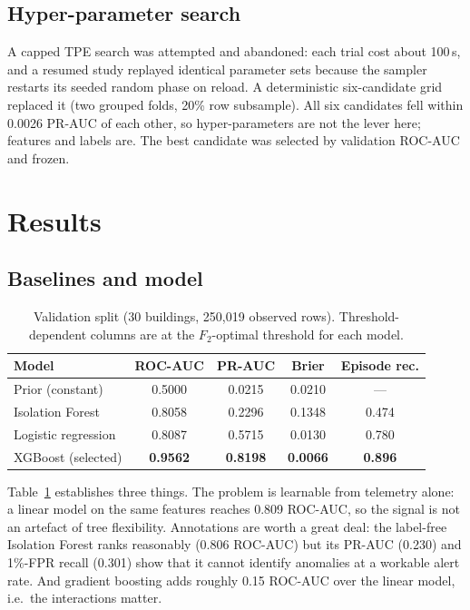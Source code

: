 \documentclass[conference]{IEEEtran}
\begin{document}
\subsection{Hyper-parameter search}

A capped TPE search was attempted and abandoned: each trial cost about 100\,s, and a resumed study
replayed identical parameter sets because the sampler restarts its seeded random phase on reload. A
deterministic six-candidate grid replaced it (two grouped folds, 20\% row subsample). All six
candidates fell within 0.0026 PR-AUC of each other, so hyper-parameters are not the lever here;
features and labels are. The best candidate was selected by validation ROC-AUC and frozen.

\section{Results}
\label{sec:results}

\subsection{Baselines and model}

\begin{table}[t]
\centering
\caption{Validation split (30 buildings, 250{,}019 observed rows). Threshold-dependent columns are at
the $F_2$-optimal threshold for each model.}
\label{tab:val}
\footnotesize
\setlength{\tabcolsep}{4pt}
\begin{tabular}{lcccc}
\toprule
Model & ROC-AUC & PR-AUC & Brier & Episode rec. \\
\midrule
Prior (constant) & 0.5000 & 0.0215 & 0.0210 & --- \\
Isolation Forest & 0.8058 & 0.2296 & 0.1348 & 0.474 \\
Logistic regression & 0.8087 & 0.5715 & 0.0130 & 0.780 \\
XGBoost (selected) & \textbf{0.9562} & \textbf{0.8198} & \textbf{0.0066} & \textbf{0.896} \\
\bottomrule
\end{tabular}
\end{table}

Table~\ref{tab:val} establishes three things. The problem is learnable from telemetry alone: a linear
model on the same features reaches 0.809 ROC-AUC, so the signal is not an artefact of tree
flexibility. Annotations are worth a great deal: the label-free Isolation Forest ranks reasonably
(0.806 ROC-AUC) but its PR-AUC (0.230) and 1\%-FPR recall (0.301) show that it cannot identify
anomalies at a workable alert rate. And gradient boosting adds roughly 0.15 ROC-AUC over the linear
model, i.e.\ the interactions matter.
\end{document}
